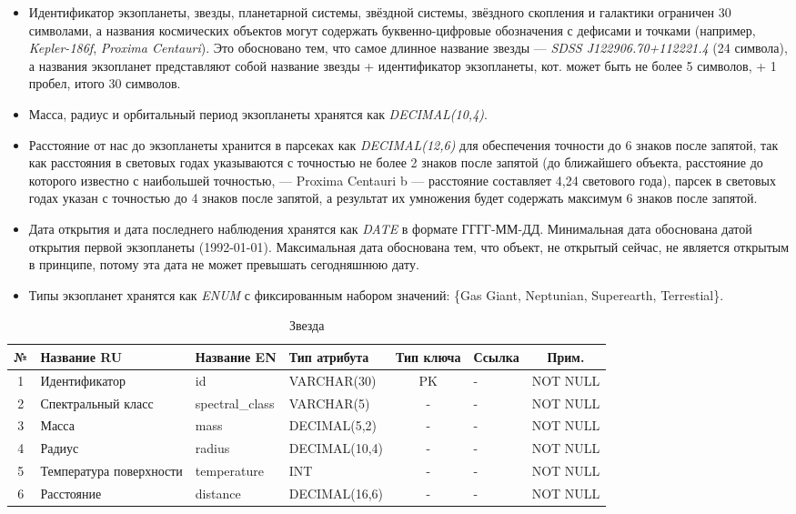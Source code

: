 \documentclass[14pt,a4paper]{extarticle}
\begin{document}
	\begin{itemize}
		\item Идентификатор экзопланеты, звезды, планетарной системы, звёздной системы, звёздного
	скопления и галактики ограничен 30 символами, а названия космических объектов
	могут содержать буквенно-цифровые обозначения с дефисами и точками (например,
	\textit{Kepler-186f}, \textit{Proxima Centauri}). Это обосновано тем, что самое длинное
	название звезды --- \textit{SDSS J122906.70+112221.4} (24 символа), а названия экзопланет представляют собой название звезды + идентификатор экзопланеты,
	кот. может быть не более 5 символов, + 1 пробел, итого 30 символов.
		\item Масса, радиус и орбитальный период экзопланеты хранятся как \textit{DECIMAL(10,4)}.
		\item Расстояние от нас до экзопланеты хранится в парсеках как \textit{DECIMAL(12,6)} для обеспечения точности до
	6 знаков после запятой, так как расстояния в световых годах указываются с точностью не более 2 знаков после запятой (до ближайшего объекта, расстояние до которого известно с наибольшей точностью, --- Proxima Centauri b --- расстояние составляет 4,24 светового года), парсек в световых годах указан с точностью до 4 знаков после запятой, а результат их умножения будет содержать максимум 6 знаков после запятой.
		\item Дата открытия и дата последнего наблюдения хранятся как \textit{DATE} в формате
	ГГГГ-ММ-ДД. Минимальная дата обоснована датой открытия первой экзопланеты (1992-01-01). Максимальная дата обоснована тем, что объект, не открытый сейчас, не является открытым в принципе, потому эта дата не может превышать сегодняшнюю дату.
		\item Типы экзопланет хранятся как \textit{ENUM} с фиксированным набором
	значений: \{Gas Giant, Neptunian, Superearth, Terrestial\}.
	\end{itemize}

	\begin{table}[H]
		\centering
		\caption{Звезда}
		\small
		\begin{tabular}{|c|p{3.2cm}|p{2.6cm}|p{2.8cm}|c|p{2.5cm}|c|}
\hline
№ & Название RU & Название EN & Тип атрибута & Тип ключа & Ссылка & Прим. \\
\hline
1 & Идентификатор & id & VARCHAR(30) & PK & - & NOT NULL \\
2 & Спектральный класс & spectral_class & VARCHAR(5) & - & - & NOT NULL \\
3 & Масса & mass & DECIMAL(5,2) & - & - & NOT NULL \\
4 & Радиус & radius & DECIMAL(10,4) & - & - & NOT NULL \\
5 & Температура поверхности & temperature & INT & - & - & NOT NULL \\
6 & Расстояние & distance & DECIMAL(16,6) & - & - & NOT NULL \\
\hline
\end{tabular}
	\end{table}
\end{document}
